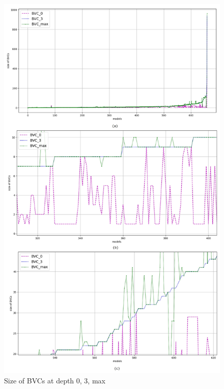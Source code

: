  \begin{figure}
 \centering
  \includegraphics[width=.85\columnwidth]{figs/bvc_g.jpg}
  \caption{Size of BVCs at depth 0, 3, max}
  \vspace{0.1in}
  \label{fig:bvc-growth}
\end{figure}

       
       


